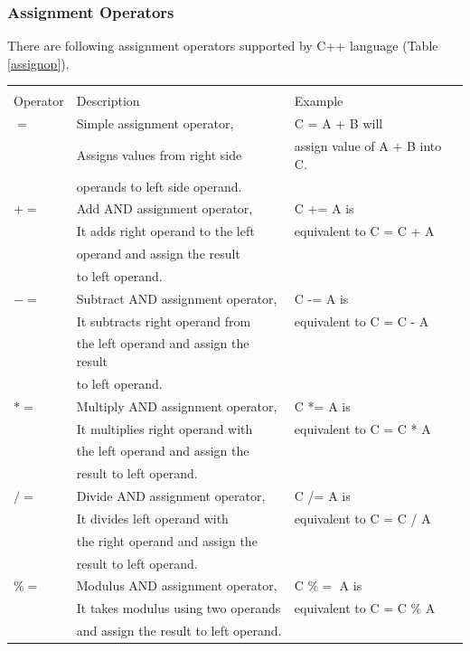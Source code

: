 \documentclass{book}
\begin{document}
\subsubsection{Assignment Operators}

There are following assignment operators supported by C++ language (Table \ref{assignop}). 

\begin{table}[h]
\tiny
\centering 
\begin{tabular}{lll} \hline \\
Operator	& Description	& Example \\ \hline 
$=$ &	Simple assignment operator, &	C = A + B will  \\
& Assigns values from right side & assign value of A + B into C. \\
& operands to left side operand.  & \\
$+=$ &	Add AND assignment operator, & C += A is  \\
& It adds right operand to the left & equivalent to C = C + A\\
& operand and assign the result  & \\
& to left operand. & \\
$-=$	& Subtract AND assignment operator, &	C -= A is  \\
& It subtracts right operand from  & equivalent to C = C - A \\
& the left operand and assign the result & \\
& to left operand. & \\
$*=$ & Multiply AND assignment operator, &	C *= A is  \\
& It multiplies right operand with  & equivalent to C = C * A \\
& the left operand and assign the  & \\
& result to left operand. & \\
$/=$ &	Divide AND assignment operator, &	C /= A is  \\
& It divides left operand with  & equivalent to C = C / A \\
& the right operand and assign the  & \\
& result to left operand. & \\
$\%=$	& Modulus AND assignment operator, &	C $\%=$ A is  \\
& It takes modulus using two operands  & equivalent to C = C \% A \\
& and assign the result to left operand. & \\

\end{tabular}
\end{table}
\end{document}
